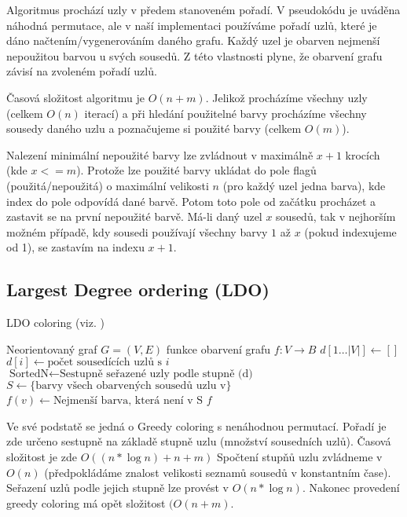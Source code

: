 \documentclass[12pt, a4paper]{article}
\begin{document}
Algoritmus prochází uzly v předem stanoveném pořadí.
V pseudokódu je uváděna náhodná permutace, ale v naší implementaci používáme pořadí uzlů, které je dáno načtením/vygenerováním daného grafu.
Každý uzel je obarven nejmenší nepoužitou barvou u svých sousedů.
Z této vlastnosti plyne, že obarvení grafu závisí na zvoleném pořadí uzlů.

Časová složitost algoritmu je $O(n+m)$.
Jelikož procházíme všechny uzly (celkem $O(n)$ iterací)
a při hledání použitelné barvy procházíme všechny sousedy daného uzlu a poznačujeme si použité barvy (celkem $O(m)$).

Nalezení minimální nepoužité barvy lze zvládnout v maximálně $x+1$ krocích (kde $x <= m$).
Protože lze použité barvy ukládat do pole flagů (použitá/nepoužitá) o maximální velikosti $n$ (pro každý uzel jedna barva),
kde index do pole odpovídá dané barvě.
Potom toto pole od začátku procházet a zastavit se na první nepoužité barvě.
Má-li daný uzel $x$ sousedů, tak v nejhorším možném případě, kdy sousedi používají všechny barvy $1$ až $x$ (pokud indexujeme od 1),
se zastavím na indexu $x+1$.

\subsection{Largest Degree ordering (LDO)}
\begin{algorithm}
\caption{LDO coloring (viz. \cite{lit4})} %
\label{Greedy coloring}
\begin{algorithmic}
\Input Neorientovaný graf $G = (V, E)$
\Output funkce obarvení grafu $f: 	V \rightarrow B$
\State $d[1 \dots |V|] \leftarrow []$
	\State $d[i] \leftarrow \text{počet sousedících uzlů s }i$
\EndFor
\State $\text{SortedN} \leftarrow \text{Sestupně seřazené uzly podle stupně (d)}$
	\State $S \leftarrow \{ \text{barvy všech obarvených sousedů uzlu v} \}$
	\State $f(v) \leftarrow \text{Nejmenší barva, která není v S}$ 
\EndFor
\State \Return $f$
\end{algorithmic}
\end{algorithm}

Ve své podstatě se jedná o Greedy coloring s nenáhodnou permutací.
Pořadí je zde určeno sestupně na základě stupně uzlu (množství sousedních uzlů).
Časová složitost je zde $O((n* \log n) + n + m)$
Spočtení stupňů uzlu zvládneme v $O(n)$ (předpokládáme znalost velikosti seznamů sousedů v konstantním čase).
Seřazení uzlů podle jejich stupně lze provést v $O(n * \log n)$.
Nakonec provedení greedy coloring má opět složitost $(O(n + m)$. 
\end{document}
